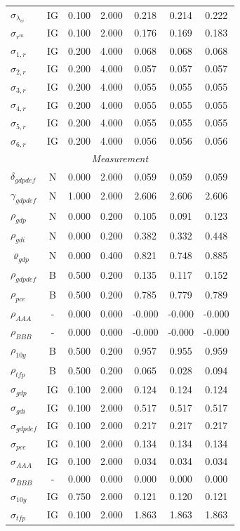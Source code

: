 \documentclass[12pt]{article}
\begin{document}
{\begin{longtable}{lcccccc}
$\sigma_{\lambda_w}$ & IG &    0.100 &    2.000 &    0.218 &    0.214 &    0.222 \\
$\sigma_{r^m}$ & IG &    0.100 &    2.000 &    0.176 &    0.169 &    0.183 \\
$\sigma_{1,r}$ & IG &    0.200 &    4.000 &    0.068 &    0.068 &    0.068 \\
$\sigma_{2,r}$ & IG &    0.200 &    4.000 &    0.057 &    0.057 &    0.057 \\
$\sigma_{3,r}$ & IG &    0.200 &    4.000 &    0.055 &    0.055 &    0.055 \\
$\sigma_{4,r}$ & IG &    0.200 &    4.000 &    0.055 &    0.055 &    0.055 \\
$\sigma_{5,r}$ & IG &    0.200 &    4.000 &    0.055 &    0.055 &    0.055 \\
$\sigma_{6,r}$ & IG &    0.200 &    4.000 &    0.056 &    0.056 &    0.056 \\
\multicolumn{7}{c}{\textit{Measurement}} \\[3pt]
$\delta_{gdpdef}$ & N &    0.000 &    2.000 &    0.059 &    0.059 &    0.059 \\
$\gamma_{gdpdef}$ & N &    1.000 &    2.000 &    2.606 &    2.606 &    2.606 \\
$\rho_{gdp}$ & N &    0.000 &    0.200 &    0.105 &    0.091 &    0.123 \\
$\rho_{gdi}$ & N &    0.000 &    0.200 &    0.382 &    0.332 &    0.448 \\
$\varrho_{gdp}$ & N &    0.000 &    0.400 &    0.821 &    0.748 &    0.885 \\
$\rho_{gdpdef}$ & B &    0.500 &    0.200 &    0.135 &    0.117 &    0.152 \\
$\rho_{pce}$ & B &    0.500 &    0.200 &    0.785 &    0.779 &    0.789 \\
$\rho_{AAA}$ & - &    0.000 &    0.000 &   -0.000 &   -0.000 &   -0.000 \\
$\rho_{BBB}$ & - &    0.000 &    0.000 &   -0.000 &   -0.000 &   -0.000 \\
$\rho_{10y}$ & B &    0.500 &    0.200 &    0.957 &    0.955 &    0.959 \\
$\rho_{tfp}$ & B &    0.500 &    0.200 &    0.065 &    0.028 &    0.094 \\
$\sigma_{gdp}$ & IG &    0.100 &    2.000 &    0.124 &    0.124 &    0.124 \\
$\sigma_{gdi}$ & IG &    0.100 &    2.000 &    0.517 &    0.517 &    0.517 \\
$\sigma_{gdpdef}$ & IG &    0.100 &    2.000 &    0.217 &    0.217 &    0.217 \\
$\sigma_{pce}$ & IG &    0.100 &    2.000 &    0.134 &    0.134 &    0.134 \\
$\sigma_{AAA}$ & IG &    0.100 &    2.000 &    0.034 &    0.034 &    0.034 \\
$\sigma_{BBB}$ & - &    0.000 &    0.000 &    0.000 &    0.000 &    0.000 \\
$\sigma_{10y}$ & IG &    0.750 &    2.000 &    0.121 &    0.120 &    0.121 \\
$\sigma_{tfp}$ & IG &    0.100 &    2.000 &    1.863 &    1.863 &    1.863 \\
\end{longtable}}
\end{document}
